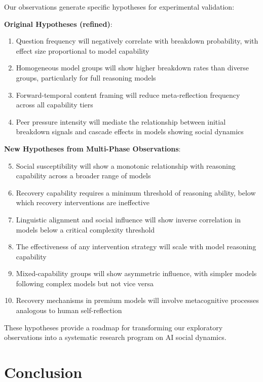 \documentclass[11pt,letterpaper]{article}
\begin{document}
Our observations generate specific hypotheses for experimental validation:

\textbf{Original Hypotheses (refined)}:
\begin{enumerate}
    \item Question frequency will negatively correlate with breakdown probability, with effect size proportional to model capability
    \item Homogeneous model groups will show higher breakdown rates than diverse groups, particularly for full reasoning models
    \item Forward-temporal content framing will reduce meta-reflection frequency across all capability tiers
    \item Peer pressure intensity will mediate the relationship between initial breakdown signals and cascade effects in models showing social dynamics
\end{enumerate}

\textbf{New Hypotheses from Multi-Phase Observations}:
\begin{enumerate}
    \setcounter{enumi}{4}
    \item Social susceptibility will show a monotonic relationship with reasoning capability across a broader range of models
    \item Recovery capability requires a minimum threshold of reasoning ability, below which recovery interventions are ineffective
    \item Linguistic alignment and social influence will show inverse correlation in models below a critical complexity threshold
    \item The effectiveness of any intervention strategy will scale with model reasoning capability
    \item Mixed-capability groups will show asymmetric influence, with simpler models following complex models but not vice versa
    \item Recovery mechanisms in premium models will involve metacognitive processes analogous to human self-reflection
\end{enumerate}

These hypotheses provide a roadmap for transforming our exploratory observations into a systematic research program on AI social dynamics.

\section{Conclusion}
\end{document}
